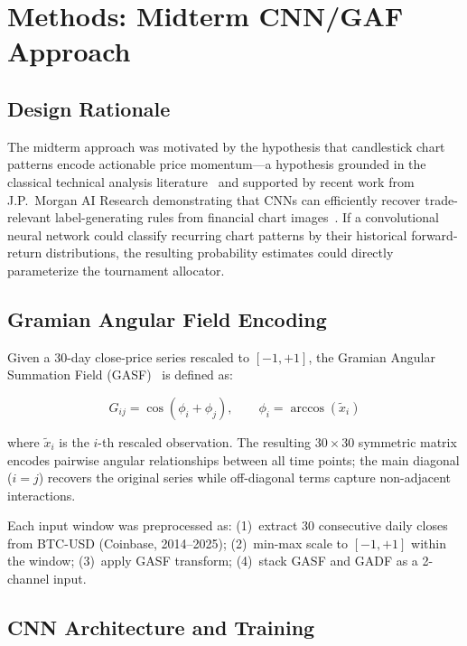 \documentclass[11pt,letterpaper]{article}
\begin{document}
\section{Methods: Midterm CNN/GAF Approach}
\label{sec:cnn}

\subsection{Design Rationale}

The midterm approach was motivated by the hypothesis that candlestick chart
patterns encode actionable price momentum---a hypothesis grounded in the
classical technical analysis literature~\cite{edwards2018} and supported by
recent work from J.P.~Morgan AI Research demonstrating that CNNs can
efficiently recover trade-relevant label-generating rules from financial chart
images~\cite{cohen2020,sood2021}.  If a convolutional neural network
could classify recurring chart patterns by their historical forward-return
distributions, the resulting probability estimates could directly parameterize
the tournament allocator.

\subsection{Gramian Angular Field Encoding}

Given a 30-day close-price series rescaled to $[-1,+1]$, the Gramian Angular
Summation Field (GASF)~\cite{wang2015} is defined as:

\begin{equation}
  G_{ij} = \cos(\phi_i + \phi_j), \qquad \phi_i = \arccos(\tilde{x}_i)
  \label{eq:gasf}
\end{equation}

where $\tilde{x}_i$ is the $i$-th rescaled observation.  The resulting
$30{\times}30$ symmetric matrix encodes pairwise angular relationships between
all time points; the main diagonal ($i=j$) recovers the original series while
off-diagonal terms capture non-adjacent interactions.

Each input window was preprocessed as: (1)~extract 30 consecutive daily closes
from BTC-USD (Coinbase, 2014--2025); (2)~min-max scale to $[-1,+1]$ within the
window; (3)~apply GASF transform; (4)~stack GASF and GADF as a 2-channel input.

\subsection{CNN Architecture and Training}
\end{document}
